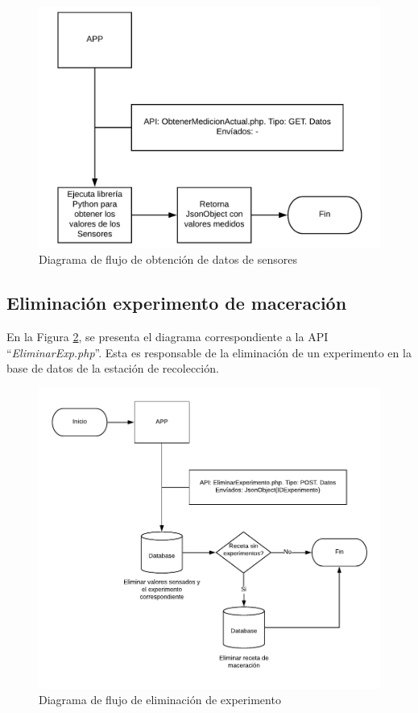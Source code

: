             \begin{figure}[h]
                \centering
                \includegraphics[scale=0.40]{DiagramaGetTempPh.pdf}
                \caption{Diagrama de flujo de obtención de datos de sensores}
                \label{fig:ApiGetTempPh}
            \end{figure}
        
        \subsection{Eliminación experimento de maceración}
        \par En la Figura \ref{fig:ApiRemoveExp}, se presenta el diagrama correspondiente a la API ``\textit{EliminarExp.php}''. Esta es responsable de la eliminación de un experimento en la base de datos de la estación de recolección.
            \begin{figure}[h]
                \centering
                \includegraphics[scale=1]{DiagramaRemoveExp.pdf}
                \caption{Diagrama de flujo de eliminación de experimento}
                \label{fig:ApiRemoveExp}
            \end{figure}
            
